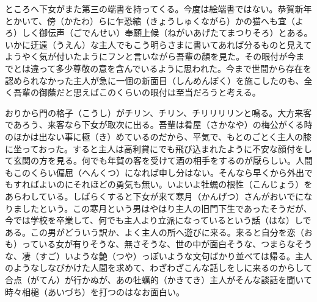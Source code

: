 \documentclass{book}
\begin{document}
ところへ下女がまた第三の端書を持ってくる。今度は絵端書ではない。恭賀新年とかいて、傍（かたわ）らに乍恐縮（きょうしゅくながら）かの猫へも宜（よろ）しく御伝声（ごでんせい）奉願上候（ねがいあげたてまつりそろ）とある。いかに迂遠（うえん）な主人でもこう明らさまに書いてあれば分るものと見えてようやく気が付いたようにフンと言いながら吾輩の顔を見た。その眼付が今までとは違って多少尊敬の意を含んでいるように思われた。今まで世間から存在を認められなかった主人が急に一個の新面目（しんめんぼく）を施こしたのも、全く吾輩の御蔭だと思えばこのくらいの眼付は至当だろうと考える。

おりから門の格子（こうし）がチリン、チリン、チリリリリンと鳴る。大方来客であろう、来客なら下女が取次に出る。吾輩は肴屋（さかなや）の梅公がくる時のほかは出ない事に極（き）めているのだから、平気で、もとのごとく主人の膝に坐っておった。すると主人は高利貸にでも飛び込まれたように不安な顔付をして玄関の方を見る。何でも年賀の客を受けて酒の相手をするのが厭らしい。人間もこのくらい偏屈（へんくつ）になれば申し分はない。そんなら早くから外出でもすればよいのにそれほどの勇気も無い。いよいよ牡蠣の根性（こんじょう）をあらわしている。しばらくすると下女が来て寒月（かんげつ）さんがおいでになりましたという。この寒月という男はやはり主人の旧門下生であったそうだが、今では学校を卒業して、何でも主人より立派になっているという話（はな）しである。この男がどういう訳か、よく主人の所へ遊びに来る。来ると自分を恋（おも）っている女が有りそうな、無さそうな、世の中が面白そうな、つまらなそうな、凄（すご）いような艶（つや）っぽいような文句ばかり並べては帰る。主人のようなしなびかけた人間を求めて、わざわざこんな話しをしに来るのからして合点（がてん）が行かぬが、あの牡蠣的（かきてき）主人がそんな談話を聞いて時々相槌（あいづち）を打つのはなお面白い。
\end{document}
